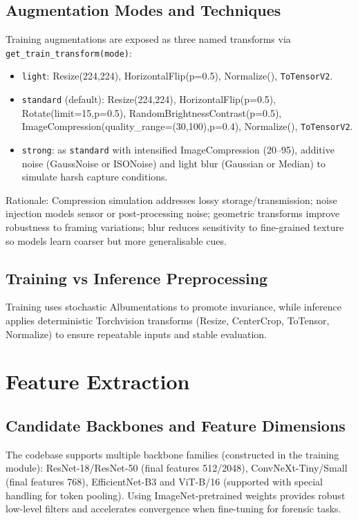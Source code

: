 \documentclass[11pt]{report}
\begin{document}
\subsection{Augmentation Modes and Techniques}
Training augmentations are exposed as three named transforms via
\texttt{get_train_transform(mode)}:
\begin{itemize}
  \item \texttt{light}: Resize(224,224), HorizontalFlip(p=0.5), Normalize(),
  \texttt{ToTensorV2}.
  \item \texttt{standard} (default): Resize(224,224), HorizontalFlip(p=0.5),
  Rotate(limit=15,p=0.5), RandomBrightnessContrast(p=0.5),
  ImageCompression(quality_range=(30,100),p=0.4), Normalize(), \texttt{ToTensorV2}.
  \item \texttt{strong}: as \texttt{standard} with intensified ImageCompression
  (20–95), additive noise (GaussNoise or ISONoise) and light blur (Gaussian or
  Median) to simulate harsh capture conditions.
\end{itemize}

Rationale: Compression simulation addresses lossy storage/transmission; noise
injection models sensor or post-processing noise; geometric transforms improve
robustness to framing variations; blur reduces sensitivity to fine-grained
texture so models learn coarser but more generalisable cues.

\subsection{Training vs Inference Preprocessing}
Training uses stochastic Albumentations to promote invariance, while
inference applies deterministic Torchvision transforms (Resize, CenterCrop,
ToTensor, Normalize) to ensure repeatable inputs and stable evaluation.

\section{Feature Extraction}
\subsection{Candidate Backbones and Feature Dimensions}
The codebase supports multiple backbone families (constructed in the training module): ResNet-18/ResNet-50 (final features
512/2048), ConvNeXt-Tiny/Small (final features 768), EfficientNet-B3 and
ViT-B/16 (supported with special handling for token pooling). Using
ImageNet-pretrained weights provides robust low-level filters and accelerates
convergence when fine-tuning for forensic tasks.
\end{document}
